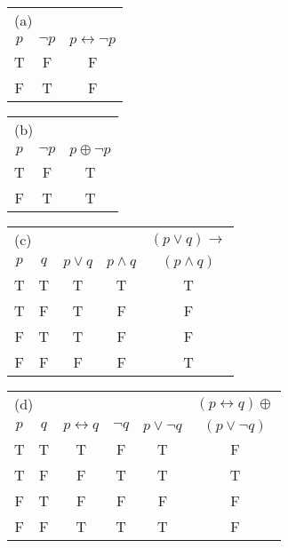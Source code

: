 \documentclass[12pt,addpoints]{exam}
\newcommand{\ra}{\rightarrow}
\newcommand{\lra}{\leftrightarrow}
\newcommand{\xor}{\oplus}
\begin{document}
\begin{questions}
\begin{solution}
        \begin{tabular}{c|c||c}
            \multicolumn{3}{l}{ (a) } \\
            $p$ & $\neg p$ & $p \lra \neg p$ \\
         \hline
            T & F & F \\
            F & T & F \\
         \end{tabular} \hspace{1in}
         \begin{tabular}{c|c||c}
            \multicolumn{3}{l}{ (b) } \\
            $p$ & $\neg p$ & $p \xor \neg p$ \\
         \hline
            T & F & T \\
            F & T & T \\
         \end{tabular}

        \smallskip
        \begin{tabular}{c|c||c|c|c}
            \multicolumn{4}{l}{ (c) } & $(p \vee q) \ra $ \\
            $p$ & $q$ & $p \vee q$ & $p \wedge q$ & $(p \wedge q)$ \\
         \hline
            T & T & T & T & T \\
            T & F & T & F & F \\
            F & T & T & F & F \\
            F & F & F & F & T \\
        \end{tabular} \hspace{0.5in}
        \begin{tabular}{c|c||c|c|c|c}
            \multicolumn{5}{l}{(d)} & $(p \lra q) \xor$ \\
            $p$ & $q$ & $p \lra q$ & $\neg q$ & $p \vee \neg q$ & $ (p \vee \neg q)$ \\
         \hline
            T & T & T & F & T & F \\
            T & F & F & T & T & T \\
            F & T & F & F & F & F \\
            F & F & T & T & T & F \\
        \end{tabular}


\end{solution}
\end{questions}
\end{document}
